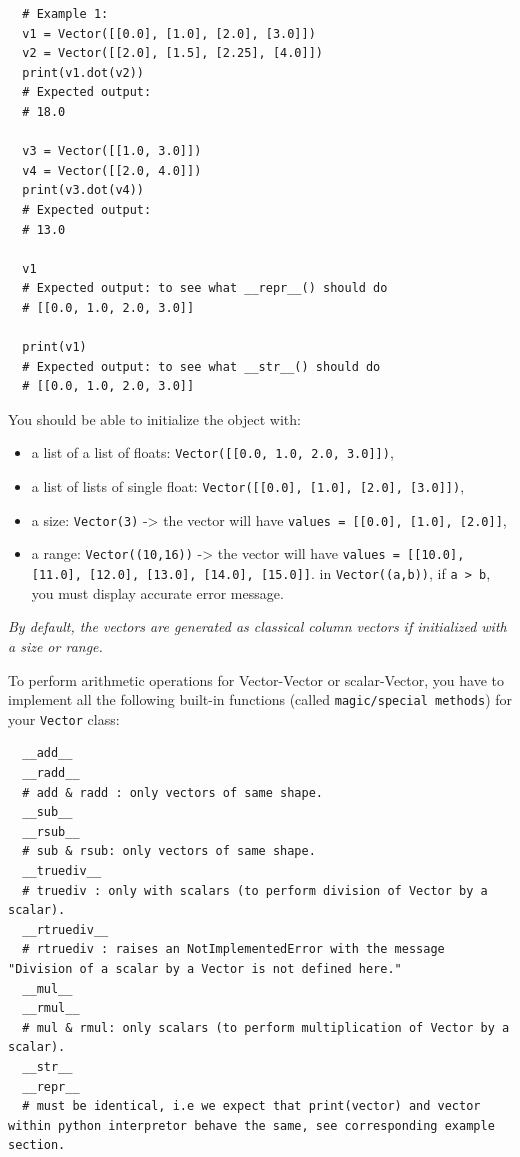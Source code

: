 \documentclass{42-en}
\begin{document}
\begin{verbatim}
  # Example 1:
  v1 = Vector([[0.0], [1.0], [2.0], [3.0]])
  v2 = Vector([[2.0], [1.5], [2.25], [4.0]])
  print(v1.dot(v2))
  # Expected output:
  # 18.0

  v3 = Vector([[1.0, 3.0]])
  v4 = Vector([[2.0, 4.0]])
  print(v3.dot(v4))
  # Expected output:
  # 13.0

  v1
  # Expected output: to see what __repr__() should do
  # [[0.0, 1.0, 2.0, 3.0]]

  print(v1)
  # Expected output: to see what __str__() should do
  # [[0.0, 1.0, 2.0, 3.0]]
\end{verbatim}

You should be able to initialize the object with:
\begin{itemize}
  \item a list of a list of floats: \texttt{Vector([[0.0, 1.0, 2.0, 3.0]])},
  \item a list of lists of single float: \texttt{Vector([[0.0], [1.0], [2.0], [3.0]])},
  \item a size: \texttt{Vector(3)} -> the vector will have \texttt{values = [[0.0], [1.0], [2.0]]},
  \item a range: \texttt{Vector((10,16))} -> the vector will have \texttt{values = [[10.0], [11.0], [12.0], [13.0], [14.0], [15.0]]}.
    in \texttt{Vector((a,b))}, if \texttt{a > b}, you must display accurate error message.
\end{itemize}

\textit{By default, the vectors are generated as classical column vectors if initialized with a size or range.}

To perform arithmetic operations for Vector-Vector or scalar-Vector, you have to implement all the following built-in functions (called \texttt{magic/special methods}) for your \texttt{Vector} class:

\begin{verbatim}
  __add__
  __radd__
  # add & radd : only vectors of same shape.
  __sub__
  __rsub__
  # sub & rsub: only vectors of same shape.
  __truediv__
  # truediv : only with scalars (to perform division of Vector by a scalar).
  __rtruediv__
  # rtruediv : raises an NotImplementedError with the message "Division of a scalar by a Vector is not defined here."
  __mul__
  __rmul__
  # mul & rmul: only scalars (to perform multiplication of Vector by a scalar).
  __str__
  __repr__
  # must be identical, i.e we expect that print(vector) and vector within python interpretor behave the same, see corresponding example section.
\end{verbatim}
\end{document}
